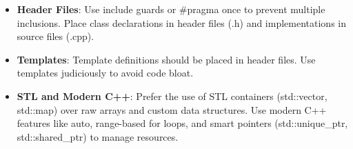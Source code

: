 \documentclass{ol-softwaremanual}
\begin{document}
\begin{itemize}
\item \textbf{Header Files}:
        Use include guards or \#pragma once to prevent multiple inclusions.
        Place class declarations in header files (.h) and implementations in source files (.cpp).

\item \textbf{Templates}:
        Template definitions should be placed in header files.
        Use templates judiciously to avoid code bloat.

\item \textbf{STL and Modern C++}:
        Prefer the use of STL containers (std::vector, std::map) over raw arrays and custom data structures. Use modern C++ features like auto, range-based for loops, and smart pointers (std::unique\_ptr, std::shared\_ptr) to manage resources.
\end{itemize}
\end{document}
